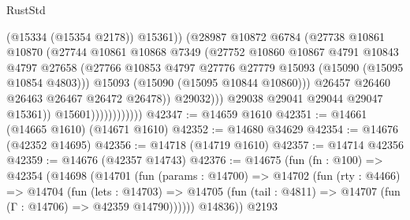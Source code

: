 \begin{lexlean}{RustStd}
\begin{coremodule}
                                        (@15334 (@15354 @2178))
                                        @15361))
                                    (@28987
                                      @10872
                                      @6784
                                      (@27738
                                        @10861
                                        @10870
                                        (@27744
                                          @10861
                                          @10868
                                          @7349
                                          (@27752
                                            @10860
                                            @10867
                                            @4791
                                            @10843
                                            @4797
                                            @27658
                                            (@27766
                                              @10853
                                              @4797
                                              @27776
                                              @27779
                                              @15093
                                              (@15090 (@15095 @10854 @4803)))
                                            @15093
                                            (@15090 (@15095 @10844 @10860)))
                                          @26457
                                          @26460
                                          @26463
                                          @26467
                                          @26472
                                          @26478))
                                      @29032)))
                                @29038
                                @29041
                                @29044
                                @29047
                                @15361))
                            @15601))))))))))))
@42347 := @14659 @1610
@42351 := @14661 (@14665 @1610) (@14671 @1610)
@42352 := @14680 @34629
@42354 := @14676 (@42352 @14695)
@42356 := @14718 (@14719 @1610)
@42357 := @14714 @42356
@42359 := @14676 (@42357 @14743)
@42376 := @14675
    (fun (fn : @100) =>
    @42354
      (@14698
        (@14701
          (fun (params : @14700) =>
          @14702
            (fun (rty : @4466) =>
            @14704
              (fun (lets : @14703) =>
              @14705 (fun (tail : @4811) => @14707 (fun (Γ : @14706) => @42359 @14790))))))
        @14836))
    @2193

\end{coremodule}
\end{lexlean}
